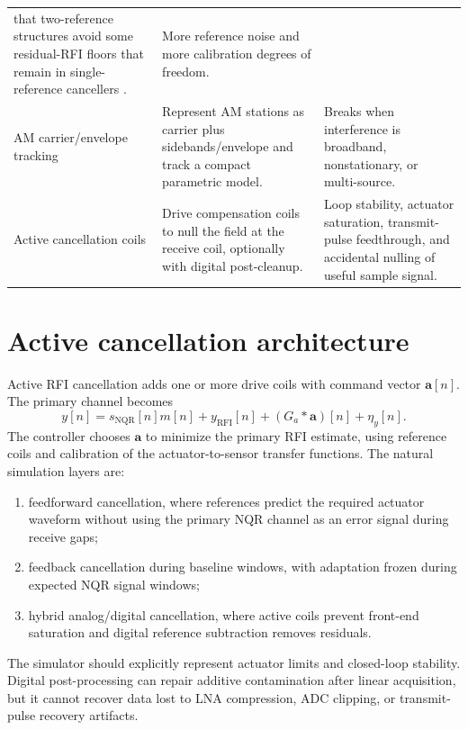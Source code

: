 \documentclass[10pt]{article}
\newcommand{\NQR}{\mathrm{NQR}}
\newcommand{\RFI}{\mathrm{RFI}}
\begin{document}
\begin{table}[h!]
\begin{tabularx}{\textwidth}{@{}>{\raggedright\arraybackslash}p{}>{\raggedright\arraybackslash}X>{\raggedright\arraybackslash}p{}@{}}
that two-reference structures avoid some residual-RFI floors that remain in
single-reference cancellers \cite{mitchell2010}. &
More reference noise and more calibration degrees of freedom. \\
AM carrier/envelope tracking &
Represent AM stations as carrier plus sidebands/envelope and track a compact
parametric model. &
Breaks when interference is broadband, nonstationary, or multi-source. \\
Active cancellation coils &
Drive compensation coils to null the field at the receive coil, optionally with
digital post-cleanup. &
Loop stability, actuator saturation, transmit-pulse feedthrough, and accidental
nulling of useful sample signal. \\
\bottomrule
\end{tabularx}
\end{table}

\section{Active cancellation architecture}

Active RFI cancellation adds one or more drive coils with command vector
\(\mathbf a[n]\).  The primary channel becomes
\begin{equation}
  y[n] = s_{\NQR}[n]m[n] + y_{\RFI}[n] + (G_a*\mathbf a)[n] + \eta_y[n].
\end{equation}
The controller chooses \(\mathbf a\) to minimize the primary RFI estimate, using
reference coils and calibration of the actuator-to-sensor transfer functions.
The natural simulation layers are:
\begin{enumerate}
  \item feedforward cancellation, where references predict the required actuator
        waveform without using the primary NQR channel as an error signal during
        receive gaps;
  \item feedback cancellation during baseline windows, with adaptation frozen
        during expected NQR signal windows;
  \item hybrid analog/digital cancellation, where active coils prevent front-end
        saturation and digital reference subtraction removes residuals.
\end{enumerate}
The simulator should explicitly represent actuator limits and closed-loop
stability.  Digital post-processing can repair additive contamination after
linear acquisition, but it cannot recover data lost to LNA compression, ADC
clipping, or transmit-pulse recovery artifacts.
\end{document}
